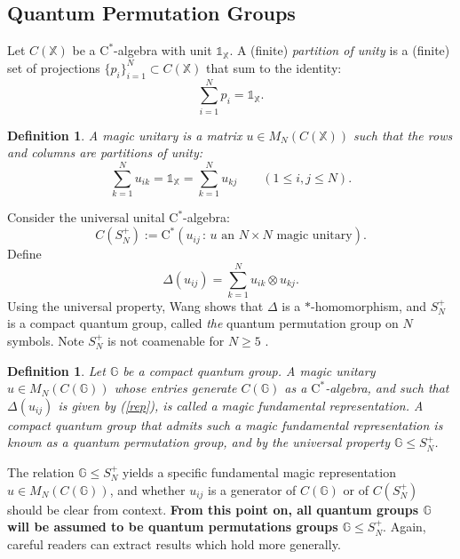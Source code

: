 \documentclass[12pt]{amsart}
\newtheorem{definition}[theorem]{Definition}
\theoremstyle{remark}
\theoremstyle{remark}
\begin{document}
\subsection{Quantum Permutation Groups}
Let $C(\mathbb{X})$ be a $\mathrm{C}^*$-algebra with unit $\mathds{1}_{\mathbb{X}}$. A (finite) \emph{partition of unity} is a (finite) set of projections $\{p_i\}_{i=1}^N\subset C(\mathbb{X})$ that sum to the identity:
$$\sum_{i=1}^Np_i=\mathds{1}_{\mathbb{X}}.$$
\begin{definition}
A \emph{magic unitary} is a matrix $u\in M_N(C(\mathbb{X}))$ such that the rows and columns are partitions of unity:
$$\sum_{k=1}^Nu_{ik}=\mathds{1}_{\mathbb{X}}=\sum_{k=1}^Nu_{kj}\qquad (1\leq i,j\leq N).$$
\end{definition}
Consider the universal unital $\mathrm{C}^*$-algebra:
$$C(S_N^+):=\mathrm{C}^*(u_{ij}\,\colon\, u \text{ an $N\times N$ magic unitary}).$$
Define
\begin{equation}\Delta(u_{ij})=\sum_{k=1}^Nu_{ik}\otimes u_{kj}.\label{rep}\end{equation}
Using the universal property, Wang \cite{wa2} shows that $\Delta$ is a $\ast$-homomorphism, and $S_N^+$ is a compact quantum group, called \emph{the} quantum permutation group on $N$ symbols. Note $S_N^+$ is not coamenable for $N\geq 5$ \cite{ba3}.
\begin{definition}
 Let $\mathbb{G}$ be a compact quantum group. A magic unitary $u\in M_N(C(\mathbb{G}))$  whose entries generate $C(\mathbb{G})$ as a $\mathrm{C}^{*}$-algebra, and such that $\Delta(u_{ij})$ is given by (\ref{rep}), is called a \emph{magic fundamental representation}. A compact quantum group that admits such a \emph{magic fundamental representation} is known as a quantum permutation group, and by the universal property $\mathbb{G}\leq S_N^+$.
\end{definition}

The relation $\mathbb{G}\leq S_N^+$ yields a specific fundamental magic representation $u\in M_N(C(\mathbb{G}))$, and whether $u_{ij}$ is a generator of $C(\mathbb{G})$ or of $C(S_N^+)$ should be clear from  context. \textbf{From this point on, all quantum groups $\mathbb{G}$ will be assumed to be quantum permutations groups $\mathbb{G}\leq S_N^+$}. Again, careful readers can extract results which hold more generally.

\bigskip
\end{document}
